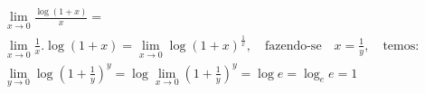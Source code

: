 \begin{ex}
\begin{align}
&\lim_{x\rightarrow 0} \frac{\log{(1+x)}}{x}=\nonumber\\
&\lim_{x\rightarrow 0} \frac{1}{x}.\log{(1+x)}=\lim_{x\rightarrow 0} \log{(1+x)^{\frac{1}{x}}},\quad\text{fazendo-se}\quad x=\frac{1}{y},\quad\text{temos:}\nonumber\\
&\lim_{y\rightarrow 0} \log{\left(1+\frac{1}{y}\right)^y}=\log{\lim_{x\rightarrow 0} \left(1+\frac{1}{y}\right)^y}=\log{e}=\log_{e}{e}=1\nonumber
\end{align}
\end{ex}
